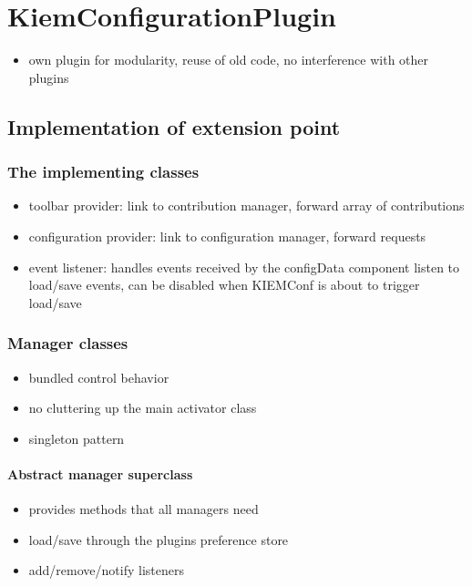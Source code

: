 \chapter{KiemConfigurationPlugin}
\label{chapter:KiemConfig}
\begin{itemize}
 \item own plugin for modularity, reuse of old code, no interference with other plugins
\end{itemize}

\section{Implementation of extension point}
\subsection{The implementing classes}
\begin{itemize}
 \item toolbar provider: link to contribution manager, forward array of contributions
 \item configuration provider: link to configuration manager, forward requests
 \item event listener: handles events received by the configData component 
    listen to load/save events, can be disabled when KIEMConf is about to trigger load/save
\end{itemize}

\subsection{Manager classes}
\begin{itemize}
 \item bundled control behavior 
 \item no cluttering up the main activator class
 \item singleton pattern
\end{itemize}
\subsubsection{Abstract manager superclass}
\begin{itemize}
 \item provides methods that all managers need
 \item load/save through the plugins preference store
 \item add/remove/notify listeners
\end{itemize}

